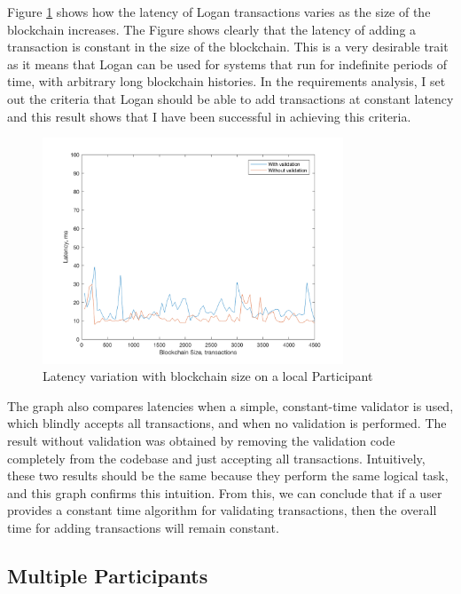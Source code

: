 \documentclass[12pt,a4paper,twoside,openright]{report}
\begin{document}
	Figure \ref{fig:locallatency} shows how the latency of Logan transactions varies as the size of the blockchain increases. 
	The Figure shows clearly that the latency of adding a transaction is constant in the size of the blockchain.
	This is a very desirable trait as it means that Logan can be used for systems that run for indefinite periods of time, with arbitrary long blockchain histories.
	In the requirements analysis, I set out the criteria that Logan should be able to add transactions at constant latency and this result shows that I have been successful in achieving this criteria.\\
	\begin{figure}
		\centering
		\includegraphics[width=0.8\textwidth]{figs/latency_vs_size.png}
		\caption{Latency variation with blockchain size on a local Participant}
		\label{fig:locallatency}
	\end{figure}

	The graph also compares latencies when a simple, constant-time validator is used, which blindly accepts all transactions, and when no validation is performed. 
	The result without validation was obtained by removing the validation code completely from the codebase and just accepting all transactions.
	Intuitively, these two results should be the same because they perform the same logical task, and this graph confirms this intuition. 
	From this, we can conclude that if a user provides a constant time algorithm for validating transactions, then the overall time for adding transactions will remain constant.
	
	\subsection{Multiple Participants}
\end{document}
